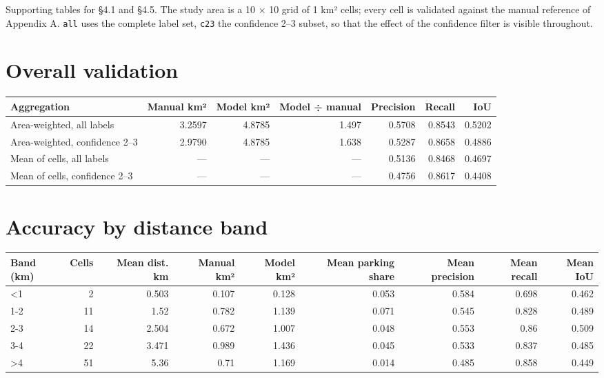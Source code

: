 Supporting tables for §4.1 and §4.5. The study area is a 10 × 10 grid of 1 km² cells; every cell is validated against the manual reference of Appendix A. \texttt{all} uses the complete label set, \texttt{c23} the confidence 2--3 subset, so that the effect of the confidence filter is visible throughout.

\hypertarget{overall-validation}{%
\section{Overall validation}\label{overall-validation}}

\begin{table}[htbp]
\centering
\begin{adjustbox}{max width=\textwidth}
\begin{tabular}{@{}lrrrrrr@{}}
\toprule
Aggregation & Manual km² & Model km² & Model ÷ manual & Precision & Recall & IoU \\
\midrule
Area-weighted, all labels & 3.2597 & 4.8785 & 1.497 & 0.5708 & 0.8543 & 0.5202 \\
Area-weighted, confidence 2--3 & 2.9790 & 4.8785 & 1.638 & 0.5287 & 0.8658 & 0.4886 \\
Mean of cells, all labels & --- & --- & --- & 0.5136 & 0.8468 & 0.4697 \\
Mean of cells, confidence 2--3 & --- & --- & --- & 0.4756 & 0.8617 & 0.4408 \\
\bottomrule
\end{tabular}
\end{adjustbox}
\end{table}
\restoreparskip

\hypertarget{accuracy-by-distance-band}{%
\section{Accuracy by distance band}\label{accuracy-by-distance-band}}

\begin{table}[htbp]
\centering
\begin{adjustbox}{max width=\textwidth}
\begin{tabular}{@{}lrrrrrrrr@{}}
\toprule
Band (km) & Cells & Mean dist. km & Manual km² & Model km² & Mean parking share & Mean precision & Mean recall & Mean IoU \\
\midrule
\textless1 & 2 & 0.503 & 0.107 & 0.128 & 0.053 & 0.584 & 0.698 & 0.462 \\
1-2 & 11 & 1.52 & 0.782 & 1.139 & 0.071 & 0.545 & 0.828 & 0.489 \\
2-3 & 14 & 2.504 & 0.672 & 1.007 & 0.048 & 0.553 & 0.86 & 0.509 \\
3-4 & 22 & 3.471 & 0.989 & 1.436 & 0.045 & 0.533 & 0.837 & 0.485 \\
\textgreater4 & 51 & 5.36 & 0.71 & 1.169 & 0.014 & 0.485 & 0.858 & 0.449 \\
\bottomrule
\end{tabular}
\end{adjustbox}
\end{table}
\restoreparskip

